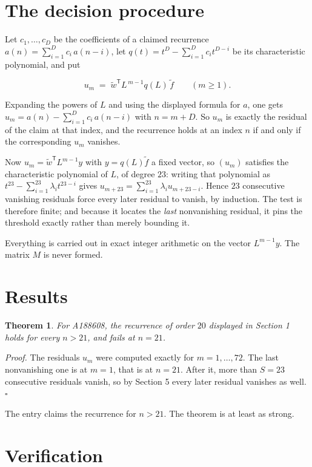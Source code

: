 \documentclass[11pt]{article}
\newtheorem{theorem}{Theorem}
\theoremstyle{definition}
\begin{document}
\section{The decision procedure}

Let $c_1,\dots,c_D$ be the coefficients of a claimed recurrence $a(n) = \sum_{i=1}^{D} c_i\,a(n-i)$, let $q(t) = t^{D} - \sum_{i=1}^{D} c_i t^{D-i}$ be its characteristic polynomial, and put

\[u_m \;=\; \tilde w^{\mathsf T} L^{\,m-1} q(L)\,\tilde f \qquad (m \ge 1).\]

Expanding the powers of $L$ and using the displayed formula for $a$, one gets $u_m = a(n) - \sum_{i=1}^{D} c_i\,a(n-i)$ with $n = m + D$. So $u_m$ is exactly the residual of the claim at that index, and the recurrence holds at an index $n$ if and only if the corresponding $u_m$ vanishes.

Now $u_m = \tilde w^{\mathsf T} L^{m-1} y$ with $y = q(L)\tilde f$ a fixed vector, so $(u_m)$ satisfies the characteristic polynomial of $L$, of degree $23$: writing that polynomial as $t^{23} - \sum_{i=1}^{23} \lambda_i t^{23-i}$ gives $u_{m+23} = \sum_{i=1}^{23} \lambda_i u_{m+23-i}$. Hence $23$ consecutive vanishing residuals force every later residual to vanish, by induction. The test is therefore finite; and because it locates the {\itshape last} nonvanishing residual, it pins the threshold exactly rather than merely bounding it.

Everything is carried out in exact integer arithmetic on the vector $L^{m-1}y$. The matrix $M$ is never formed.

\section{Results}

\begin{theorem} For A188608, the recurrence of order $20$ displayed in Section 1 holds for every $n > 21$, and fails at $n = 21$.\end{theorem}

{\itshape Proof.} The residuals $u_m$ were computed exactly for $m = 1,\dots,72$. The last nonvanishing one is at $m = 1$, that is at $n = 21$. After it, more than $S = 23$ consecutive residuals vanish, so by Section 5 every later residual vanishes as well. $\square$

The entry claims the recurrence for $n > 21$. The theorem is at least as strong.

\section{Verification}
\end{document}
